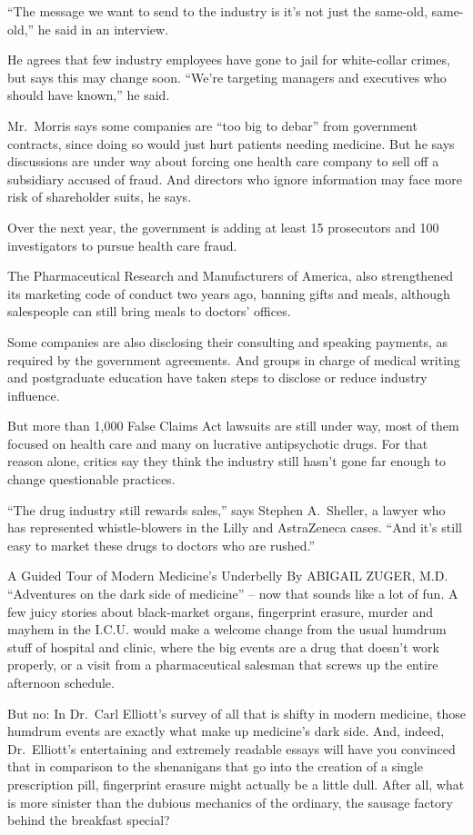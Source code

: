 ﻿\documentclass[12pt]{article}
\begin{document}
``The message we want to send to the industry is it's not just the same-old, same-old,'' he said in
an interview.

He agrees that few industry employees have gone to jail for white-collar crimes, but says this may
change soon. ``We're targeting managers and executives who should have known,'' he said.

Mr.~Morris says some companies are ``too big to debar'' from government contracts, since doing so
would just hurt patients needing medicine. But he says discussions are under way about forcing one
health care company to sell off a subsidiary accused of fraud. And directors who ignore information
may face more risk of shareholder suits, he says.

Over the next year, the government is adding at least 15 prosecutors and 100 investigators to pursue
health care fraud.

The Pharmaceutical Research and Manufacturers of America, also strengthened its marketing code of
conduct two years ago, banning gifts and meals, although salespeople can still bring meals to
doctors' offices.

Some companies are also disclosing their consulting and speaking payments, as required by the
government agreements. And groups in charge of medical writing and postgraduate education have taken
steps to disclose or reduce industry influence.

But more than 1,000 False Claims Act lawsuits are still under way, most of them focused on health
care and many on lucrative antipsychotic drugs. For that reason alone, critics say they think the
industry still hasn't gone far enough to change questionable practices.

``The drug industry still rewards sales,'' says Stephen A.~Sheller, a lawyer who has represented
whistle-blowers in the Lilly and AstraZeneca cases. ``And it's still easy to market these drugs to
doctors who are rushed.''

A Guided Tour of Modern Medicine's Underbelly By ABIGAIL ZUGER, M.D. ``Adventures on the dark side
of medicine'' -- now that sounds like a lot of fun. A few juicy stories about black-market organs,
fingerprint erasure, murder and mayhem in the I.C.U. would make a welcome change from the usual
humdrum stuff of hospital and clinic, where the big events are a drug that doesn't work properly, or
a visit from a pharmaceutical salesman that screws up the entire afternoon schedule.

But no: In Dr.~Carl Elliott's survey of all that is shifty in modern medicine, those humdrum events
are exactly what make up medicine's dark side. And, indeed, Dr.~Elliott's entertaining and extremely
readable essays will have you convinced that in comparison to the shenanigans that go into the
creation of a single prescription pill, fingerprint erasure might actually be a little dull. After
all, what is more sinister than the dubious mechanics of the ordinary, the sausage factory behind
the breakfast special?
\end{document}
